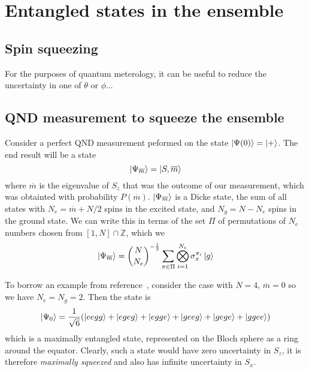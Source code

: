 \documentclass{article}
\newcommand*\meas[1]{\overline{#1}}
\begin{document}
\section{Entangled states in the ensemble}


\subsection{Spin squeezing}


For the purposes of quantum meterology, it can be useful to reduce the
uncertainty in one of $\theta$ or $\phi$...

\subsection{QND measurement to squeeze the ensemble}



Consider a perfect QND measurement peformed on the state $\ket{\Psi(0)} =
\ket{+}$. The end result will be a state
%
\begin{equation}
  \ket{\Psi_{\meas{m}}} = \ket{S, \meas{m}}
\end{equation}
%
where $\meas{m}$ is the eigenvalue of $S_z$ that was the outcome of our
measurement, which was obtainted with probability $P(\meas{m})$.
$\ket{\Psi_{\meas{m}}}$ is a Dicke state, the sum of all states with
$N_e = \meas{m} + N/2$ spins in the excited state, and $N_g = N - N_e$ spins in
the ground state.  We can write this in terms of the set $\Pi$  of permutations 
of $N_e$ numbers chosen from $[1,N]\cap\mathbb{Z}$, which we
\begin{equation}
  \ket{\Psi_{\meas{m}}} = {N \choose N_e}^{-\frac{1}{2}}\sum_{\pi \in \Pi}
  \bigotimes_{i=1}^{N_e} \sigma_x^{\pi_i} \ket{g}
\end{equation}

To borrow an example from
reference~\cite{Cox2016}, consider the case with $N=4$, $\meas{m}=0$ so we have
$N_e = N_g = 2$. Then the state is
%
\begin{equation}
  \ket{\Psi_0} = \frac{1}{\sqrt{6}}(\ket{eegg} + \ket{egeg} + \ket{egge} +
  \ket{geeg} + \ket{gege} + \ket{ggee})
\end{equation}
%
which is a maximally entangled state, represented on the Bloch sphere as a ring
around the equator.
%
Clearly, such a state would have zero uncertainty in $S_z$, it is therefore
\emph{maximally squeezed}
and also has infinite uncertainty in $S_x$.
\end{document}
